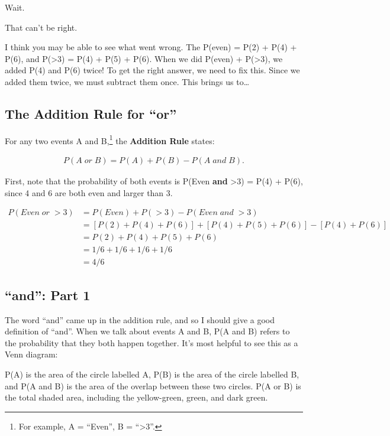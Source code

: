 \documentclass[
  letterpaper,
  DIV=11,
  numbers=noendperiod]{scrreprt}
\begin{document}
Wait.

That can't be right.

I think you may be able to see what went wrong. The P(even) = P(2) +
P(4) + P(6), and P(\textgreater3) = P(4) + P(5) + P(6). When we did
P(even) + P(\textgreater3), we added P(4) and P(6) twice! To get the
right answer, we need to fix this. Since we added them twice, we must
subtract them once. This brings us to\ldots{}

\hypertarget{the-addition-rule-for-or}{%
\subsection{The Addition Rule for
``or''}\label{the-addition-rule-for-or}}

For any two events A and B,\footnote{For example, A = ``Even'', B =
  ``\textgreater3''.} the \textbf{Addition Rule} states:

\begin{align}P(A\; or\; B) = P(A) + P(B) - P(A\; and\; B).\end{align}

First, note that the probability of both events is P(Even \textbf{and}
\textgreater3) = P(4) + P(6), since 4 and 6 are both even and larger
than 3.

\begin{align*}
 P(Even\; or\; >3) & = P(Even) + P(>3) - P(Even\; and\; >3)\\
& = [P(2) + P(4) + P(6)] + [P(4) + P(5) + P(6)] - [P(4) + P(6)]\\
& =  P(2) + P(4) + P(5) + P(6)\\
& = 1/6 + 1/6 + 1/6 + 1/6\\
& = 4/6
\end{align*} \normalsize

\hypertarget{and-part-1}{%
\subsection{``and'': Part 1}\label{and-part-1}}

The word ``and'' came up in the addition rule, and so I should give a
good definition of ``and''. When we talk about events A and B, P(A and
B) refers to the probability that they both happen together. It's most
helpful to see this as a Venn diagram:

P(A) is the area of the circle labelled A, P(B) is the area of the
circle labelled B, and P(A and B) is the area of the overlap between
these two circles. P(A or B) is the total shaded area, including the
yellow-green, green, and dark green.
\end{document}
